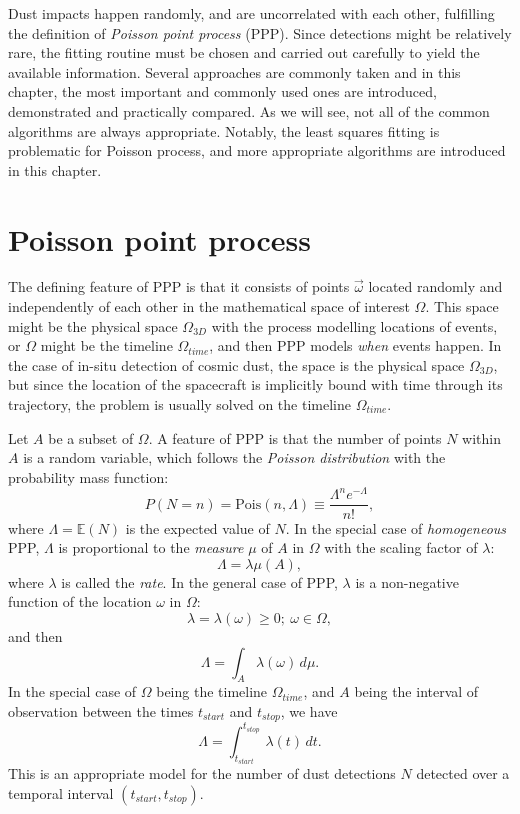 Dust impacts happen randomly, and are uncorrelated with each other, fulfilling the definition of \textit{Poisson point process} (PPP). Since detections might be relatively rare, the fitting routine must be chosen and carried out carefully to yield the available information. Several approaches are commonly taken and in this chapter, the most important and commonly used ones are introduced, demonstrated and practically compared. As we will see, not all of the common algorithms are always appropriate. Notably, the least squares fitting is problematic for Poisson process, and more appropriate algorithms are introduced in this chapter.

\section{Poisson point process}

The defining feature of PPP is that it consists of points $\vec{\omega}$ located randomly and independently of each other in the mathematical space of interest $\Omega$. This space might be the physical space $\Omega_{3D}$ with the process modelling locations of events, or $\Omega$ might be the timeline $\Omega_{time}$, and then PPP models \textit{when} events happen. In the case of in-situ detection of cosmic dust, the space is the physical space $\Omega_{3D}$, but since the location of the spacecraft is implicitly bound with time through its trajectory, the problem is usually solved on the timeline $\Omega_{time}$.

Let $A$ be a subset of $\Omega$. A feature of PPP is that the number of points $N$ within $A$ is a random variable, which follows the \textit{Poisson distribution} with the probability mass function:
\begin{equation}
    P(N=n) = \mathrm{Pois}(n,\Lambda) \equiv \frac{\Lambda^n e^{-\Lambda}}{n!}, \label{eq:poisson_pmf}
\end{equation}
where $\Lambda = \mathbb{E}(N)$ is the expected value of $N$. In the special case of \textit{homogeneous} PPP, $\Lambda$ is proportional to the \textit{measure} $\mu$ of $A$ in $\Omega$ with the scaling factor of $\lambda$:
\begin{equation}
    \Lambda = \lambda \mu(A),
\end{equation}
where $\lambda$ is called the \textit{rate}. In the general case of PPP, $\lambda$ is a non-negative function of the location $\omega$ in $\Omega$:
\begin{equation}
    \lambda = \lambda(\omega) \geq 0; \ \omega \in \Omega,
\end{equation}
and then 
\begin{equation}
    \Lambda = \int_A \lambda(\omega) \, d\mu.
\end{equation}
In the special case of $\Omega$ being the timeline $\Omega_{time}$, and $A$ being the interval of observation between the times $t_{start}$ and $t_{stop}$, we have
\begin{equation}
    \Lambda = \int_{t_{start}}^{t_{stop}} \lambda(t) \, dt.
\end{equation}
This is an appropriate model for the number of dust detections $N$ detected over a temporal interval $(t_{start},t_{stop})$.

